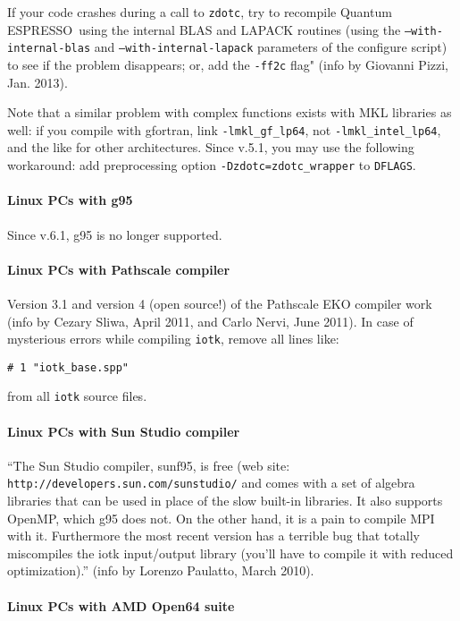 \documentclass[12pt,a4paper]{article}
\def\qe{{\sc Quantum ESPRESSO}}
\begin{document}
If your code crashes during a call to \texttt{zdotc},
try to recompile \qe\ using the internal BLAS and LAPACK
routines (using the \texttt{--with-internal-blas} and
\texttt{--with-internal-lapack} parameters of the configure script)
to see if the problem disappears; or, add the \texttt{-ff2c} flag"
(info by Giovanni Pizzi, Jan. 2013).

Note that a similar problem with complex functions exists with MKL libraries
as well: if you compile with gfortran, link \texttt{-lmkl\_gf\_lp64},
not \texttt{-lmkl\_intel\_lp64}, and the like for other architectures.
Since v.5.1, you may use the following workaround:
add preprocessing option \texttt{-Dzdotc=zdotc\_wrapper} to \texttt{DFLAGS}.

\paragraph{Linux PCs with g95}

Since v.6.1, g95 is no longer supported.

\paragraph{Linux PCs with Pathscale compiler}

Version 3.1 and version 4 (open source!) of the Pathscale EKO compiler
work (info by Cezary Sliwa, April 2011, and Carlo Nervi, June 2011).
In case of mysterious errors while compiling \texttt{iotk},
remove all lines like:
\begin{verbatim}
# 1 "iotk_base.spp"
\end{verbatim}
from all \texttt{iotk} source files.

\paragraph{Linux PCs with Sun Studio compiler}

``The Sun Studio compiler, sunf95, is free (web site:
\texttt{http://developers.sun.com/sunstudio/} and comes
with a set of algebra libraries that can be used in place of the slow
built-in libraries. It also supports OpenMP, which g95 does not. On the
other hand, it is a pain to compile MPI with it. Furthermore the most
recent version has a terrible bug that totally miscompiles the iotk
input/output library (you'll have to compile it with reduced optimization).''
(info by Lorenzo Paulatto, March 2010).

\paragraph{Linux PCs with AMD Open64 suite}
\end{document}
